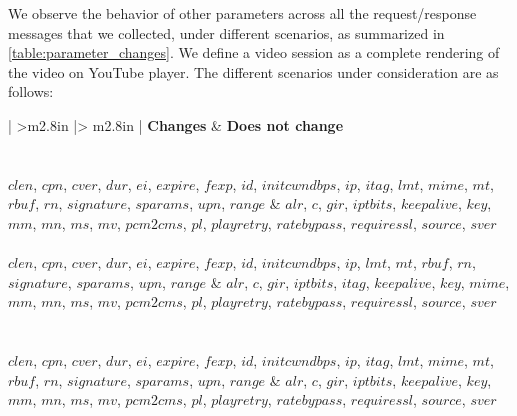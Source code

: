 We observe the behavior of other parameters across all the request/response messages that we collected, under different scenarios, as summarized in \fig\ref{table:parameter_changes}. We define a video session as a complete rendering of the video on YouTube player. The different scenarios under consideration are as follows:



\begin{table}[!t]
	\centering
	\scriptsize
	\caption{Classification of \acs{DASH} Parameters based on Their Behaviors}
	\label{table:parameter_changes}
	\begin{tabular}{ | >{\centering\arraybackslash}m{2.8in} |> {\centering\arraybackslash}m{2.8in} | }
		\hline
		\textbf{Changes} & \textbf{Does not change} \\ \hline
		  \\ \hline
		  \\ \hline
		$clen$, $cpn$, $cver$, $dur$, $ei$, $expire$, $fexp$, $id$, $initcwndbps$, $ip$, $itag$, $lmt$, $mime$, $mt$, $rbuf$, $rn$, $signature$, $sparams$, $upn$, $range$ & $alr$, $c$, $gir$, $iptbits$, $keepalive$, $key$, $mm$, $mn$, $ms$, $mv$, $pcm2cms$, $pl$, $playretry$, $ratebypass$, $requiressl$, $source$, $sver$ \\ \hline
		  \\ \hline
		$clen$, $cpn$, $cver$, $dur$, $ei$, $expire$, $fexp$, $id$, $initcwndbps$, $ip$, $lmt$, $mt$, $rbuf$, $rn$, $signature$, $sparams$, $upn$, $range$ & $alr$, $c$, $gir$, $iptbits$, $itag$, $keepalive$, $key$, $mime$, $mm$, $mn$, $ms$, $mv$, $pcm2cms$, $pl$, $playretry$, $ratebypass$, $requiressl$, $source$, $sver$ \\ \hline
		  \\ \hline
		  \\ \hline
		$clen$, $cpn$, $cver$, $dur$, $ei$, $expire$, $fexp$, $id$, $initcwndbps$, $ip$, $itag$, $lmt$, $mime$, $mt$, $rbuf$, $rn$, $signature$, $sparams$, $upn$, $range$ & $alr$, $c$, $gir$, $iptbits$, $keepalive$, $key$, $mm$, $mn$, $ms$, $mv$, $pcm2cms$, $pl$, $playretry$, $ratebypass$, $requiressl$, $source$, $sver$ \\ \hline

\end{tabular}
\end{table}
